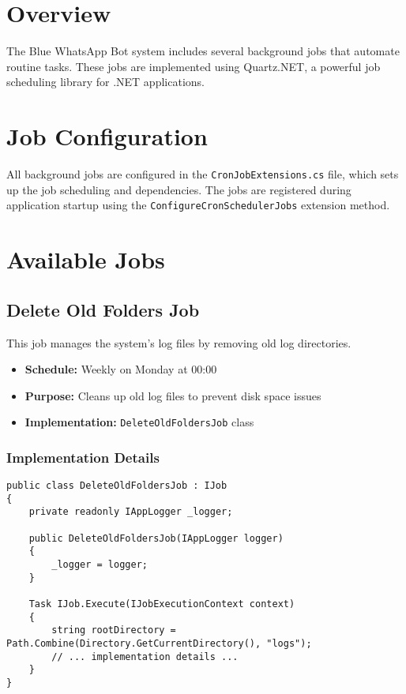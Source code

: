 \section{Overview}
The Blue WhatsApp Bot system includes several background jobs that automate routine tasks. These jobs are implemented using Quartz.NET, a powerful job scheduling library for .NET applications.

\section{Job Configuration}
All background jobs are configured in the \texttt{CronJobExtensions.cs} file, which sets up the job scheduling and dependencies. The jobs are registered during application startup using the \texttt{ConfigureCronSchedulerJobs} extension method.

\section{Available Jobs}

\subsection{Delete Old Folders Job}
This job manages the system's log files by removing old log directories.

\begin{itemize}
    \item \textbf{Schedule:} Weekly on Monday at 00:00
    \item \textbf{Purpose:} Cleans up old log files to prevent disk space issues
    \item \textbf{Implementation:} \texttt{DeleteOldFoldersJob} class
\end{itemize}

\subsubsection{Implementation Details}
\begin{lstlisting}[language=CSharp]
public class DeleteOldFoldersJob : IJob
{
    private readonly IAppLogger _logger;

    public DeleteOldFoldersJob(IAppLogger logger)
    {
        _logger = logger;
    }

    Task IJob.Execute(IJobExecutionContext context)
    {
        string rootDirectory = Path.Combine(Directory.GetCurrentDirectory(), "logs");
        // ... implementation details ...
    }
}
\end{lstlisting}

